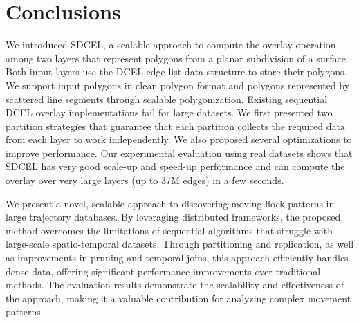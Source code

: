 \chapter{Conclusions}

We introduced SDCEL, a scalable approach to compute the overlay operation among two layers that represent polygons from a planar subdivision of a surface. Both input layers use the DCEL edge-list data structure to store their polygons. We support input polygons in clean polygon format and polygons represented by scattered line segments through scalable polygonization. Existing sequential DCEL overlay implementations fail for large datasets. We first presented two partition strategies that guarantee that each partition collects the required data from each layer to work independently. We also proposed several optimizations to improve performance. Our experimental evaluation using real datasets shows that SDCEL has very good scale-up and speed-up performance and can compute the overlay over very large layers (up to 37M edges) in a few seconds.

We present a novel, scalable approach to discovering moving flock patterns in large trajectory databases. By leveraging distributed frameworks, the proposed method overcomes the limitations of sequential algorithms that struggle with large-scale spatio-temporal datasets. Through partitioning and replication, as well as improvements in pruning and temporal joins, this approach efficiently handles dense data, offering significant performance improvements over traditional methods. The evaluation results demonstrate the scalability and effectiveness of the approach, making it a valuable contribution for analyzing complex movement patterns.
